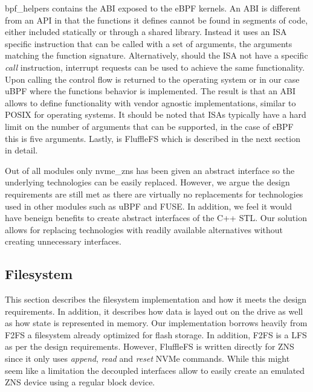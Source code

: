bpf\_helpers contains the ABI exposed to the eBPF kernels. An ABI is different
from an API in that the functions it defines cannot be found in segments of
code, either included statically or through a shared library. Instead it uses
an ISA specific instruction that can be called with a set of arguments, the
arguments matching the function signature. Alternatively, should the ISA not
have a specific \textit{call} instruction, interrupt requests can be used to
achieve the same functionality. Upon calling the control flow is returned to
the operating system or in our case uBPF where the functions behavior is
implemented. The result is that an ABI allows to define functionality with
vendor agnostic implementations, similar to POSIX for operating systems. It
should be noted that ISAs typically have a hard limit on the number of arguments
that can be supported, in the case of eBPF this is five arguments. Lastly, is
FluffleFS which is described in the next section in detail.

Out of all modules only nvme\_zns has been given an abstract interface so the
underlying technologies can be easily replaced. However, we argue the design
requirements are still met as there are virtually no replacements for
technologies used in other modules such as uBPF and FUSE\footnotemark[12].
In addition, we feel it would have beneign benefits to create abstract
interfaces of the C++ STL. Our solution allows for replacing technologies with
readily available alternatives without creating unnecessary interfaces.


\subsection{Filesystem}

This section describes the filesystem implementation and how it meets the design
requirements. In addition, it describes how data is layed out on the drive as
well as how state is represented in memory. Our implementation borrows heavily
from F2FS \cite{Lee2015F2FSAN} a filesystem already optimized for flash storage.
In addition, F2FS is a LFS as per the design requirements. However, FluffleFS is
written directly for ZNS since it only uses \textit{append}, \textit{read} and
\textit{reset} NVMe commands. While this might seem like a limitation the
decoupled interfaces allow to easily create an emulated ZNS device using a
regular block device.

